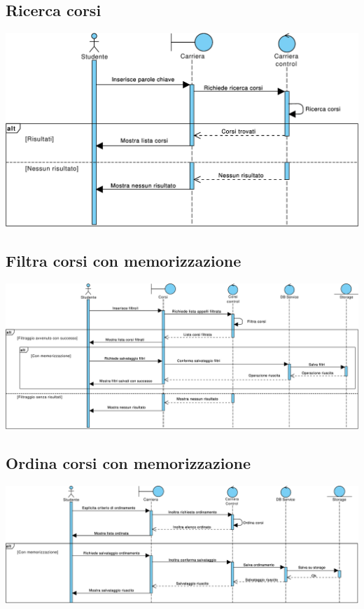 \subsection{Ricerca corsi}
\begin{center}
	\includegraphics[width=6.5in]{imgs/gruppo1/sequence_diagrams/SD2_ricerca_corsi.pdf}
\end{center}
\newpage


\subsection{Filtra corsi con memorizzazione}
\begin{center}
	\includegraphics[width=6.5in]{imgs/gruppo1/sequence_diagrams/SD3_filtra_corsi_con_memorizzazione.pdf}
\end{center}
\subsection{Ordina corsi con memorizzazione}
\begin{center}
	\includegraphics[width=6.5in]{imgs/gruppo1/sequence_diagrams/SD4_ordina_corsi_con_memorizzazione.pdf}
\end{center}
\newpage


